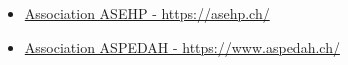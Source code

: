 \begin{itemize}
  \item \href{https://asehp.ch/}{Association ASEHP - https://asehp.ch/}
  \item \href{https://www.aspedah.ch/}{Association ASPEDAH - https://www.aspedah.ch/}
\end{itemize}